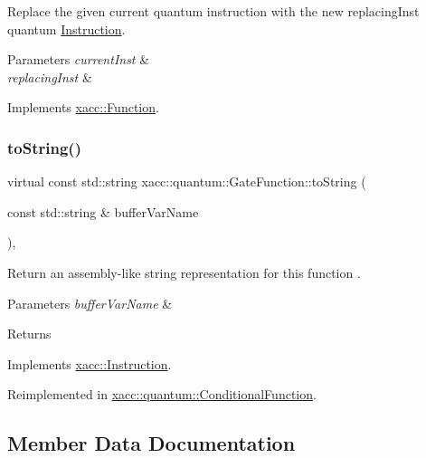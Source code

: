 Replace the given current quantum instruction with the new replacing\+Inst quantum \hyperlink{a02460}{Instruction}.


\begin{DoxyParams}{Parameters}
{\em current\+Inst} & \\
\hline
{\em replacing\+Inst} & \\
\hline
\end{DoxyParams}


Implements \hyperlink{a02456_a2ef6a4923a6734f90f6ee3d94d263af0}{xacc\+::\+Function}.

\mbox{\label{a01272_aa1950776ae84bad2d0795a0441f910e7}} 
\subsubsection{\texorpdfstring{to\+String()}{toString()}}
{\footnotesize\ttfamily virtual const std\+::string xacc\+::quantum\+::\+Gate\+Function\+::to\+String (\begin{DoxyParamCaption}\item[{const std\+::string \&}]{buffer\+Var\+Name }\end{DoxyParamCaption})\hspace{0.3cm}{\ttfamily [inline]}, {\ttfamily [virtual]}}

Return an assembly-\/like string representation for this function . 
\begin{DoxyParams}{Parameters}
{\em buffer\+Var\+Name} & \\
\hline
\end{DoxyParams}
\begin{DoxyReturn}{Returns}

\end{DoxyReturn}


Implements \hyperlink{a02460_ae94c2d089908294c1d410b14c96817ae}{xacc\+::\+Instruction}.



Reimplemented in \hyperlink{a01304_aca7a5f849fece6fc28a904efee9a3370}{xacc\+::quantum\+::\+Conditional\+Function}.



\subsection{Member Data Documentation}
\mbox{\label{a01272_aea17cb1ca610bb5b8eadb0642c32b937}} 
